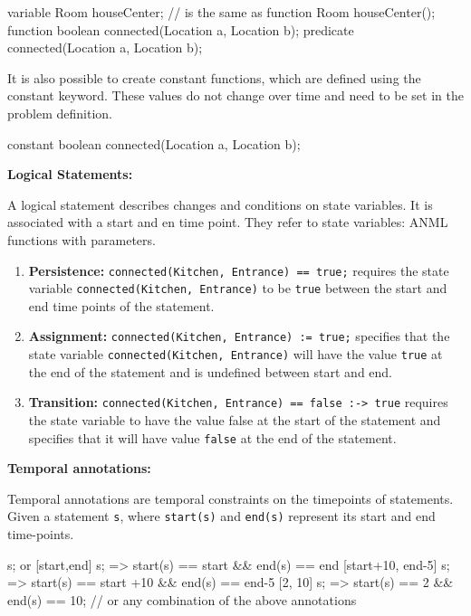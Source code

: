 \begin{anmlcode}
variable Room houseCenter; // is the same as
function Room houseCenter();
function boolean connected(Location a, Location b);
predicate connected(Location a, Location b);
\end{anmlcode}

It is also possible to create constant functions, which are defined using the constant keyword.
These values do not change over time and need to be set in the problem definition.

\begin{anmlcode}
constant boolean connected(Location a, Location b);
\end{anmlcode}



{\bf Logical Statements:}

A logical statement describes changes and conditions on state variables. It is
associated with a start and en time point.
They refer to state variables: ANML functions with parameters.
\begin{enumerate}
  \item {\bf Persistence:} \lstinline!connected(Kitchen, Entrance) == true;! requires the state
  variable \lstinline!connected(Kitchen, Entrance)! to be \lstinline!true! between the start and
  end time points of the statement.
  \item {\bf Assignment:} \lstinline!connected(Kitchen, Entrance) := true;! specifies that the
  state variable \lstinline!connected(Kitchen, Entrance)! will have the value \lstinline!true! at
  the end of the statement and is undefined between start and end.
  \item {\bf Transition:} \lstinline!connected(Kitchen, Entrance) == false :-> true! requires the
  state variable to have the value false at the start of the statement and
  specifies that it will have value \lstinline!false! at the end of the statement.
\end{enumerate}

{\bf Temporal annotations:}

Temporal annotations are temporal constraints on the timepoints of
statements. Given a statement \lstinline!s!, where \lstinline!start(s)! and \lstinline!end(s)! represent its
start and end time-points.
\begin{anmlcode}
[all] s; or [start,end] s;
=> start(s) == start && end(s) == end
[start+10, end-5] s;
=> start(s) == start +10 && end(s) == end-5
[2, 10] s;
=> start(s) == 2 && end(s) == 10;
// or any combination of the above annotations
\end{anmlcode}
  
